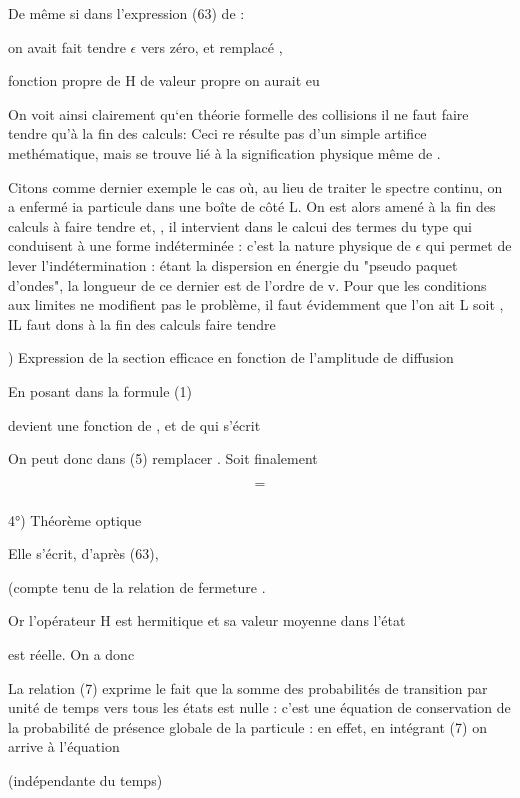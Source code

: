 
De même si dans l'expression (63) de  :

on avait fait tendre $\epsilon$ vers zéro, et remplacé ,

fonction propre de H de valeur propre on aurait eu

On voit ainsi clairement qu‘en théorie formelle des collisions
il ne faut faire tendre  qu'à la fin des calculs: Ceci re résulte
pas d'un simple artifice methématique, mais se trouve lié à la signification
physique même de .

Citons comme dernier exemple le cas où, au lieu de traiter le
spectre continu, on a enfermé ia particule dans une boîte de côté L. On
est alors amené à la fin des calculs à faire tendre  et, , il
intervient dans le calcui des termes du type  qui conduisent à une forme
indéterminée : c'est la nature physique de $\epsilon$ qui permet de lever l'indétermination : 
étant la dispersion en énergie du "pseudo paquet d'ondes", la
longueur de ce dernier est de l'ordre de v. Pour que les conditions aux
limites ne modifient pas le problème, il faut évidemment que l'on ait L 
soit , IL faut dons à la fin des calculs faire tendre

) Expression de la section efficace en fonction de l'amplitude  de diffusion

En posant dans la formule (1)

 

devient une fonction de , et de  qui s'écrit

On peut donc dans (5) remplacer . Soit finalement

\[
\tag{73}=
\]

\subsubsection{}%
4°) Théorème optique

Elle s'écrit, d'après (63),

(compte tenu de la relation de fermeture .

Or l'opérateur H est hermitique et sa valeur moyenne dans l'état 

est réelle. On a donc

La relation (7) exprime le fait que la somme des probabilités
de transition par unité de temps vers tous les états  est nulle :
c'est une équation de conservation de la probabilité de présence globale
de la particule : en effet, en intégrant (7) on arrive à l'équation

 (indépendante du temps)

